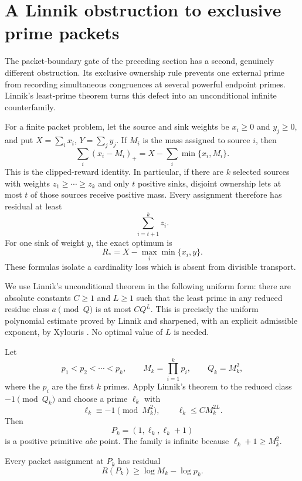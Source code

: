 \section{A Linnik obstruction to exclusive prime packets}
\label{sec:prime-packet-linnik-obstruction}

The packet-boundary gate of the preceding section has a second, genuinely
different obstruction.  Its exclusive ownership rule prevents one external
prime from recording simultaneous congruences at several powerful endpoint
primes.  Linnik's least-prime theorem turns this defect into an unconditional
infinite counterfamily.

For a finite packet problem, let the source and sink weights be $x_i\ge0$ and
$y_j\ge0$, and put $X=\sum_i x_i$, $Y=\sum_jy_j$.  If $M_i$ is the mass
assigned to source $i$, then
\[
 \sum_i(x_i-M_i)_+
   =X-\sum_i\min\{x_i,M_i\}.
 \tag{LPO-1}
\]
This is the clipped-reward identity.  In particular, if there are $k$
selected sources with weights $z_1\ge\cdots\ge z_k$ and only $t$ positive
sinks, disjoint ownership lets at most $t$ of those sources receive positive
mass.  Every assignment therefore has residual at least
\[
                         \sum_{i=t+1}^{k}z_i.
 \tag{LPO-2}
\]
For one sink of weight $y$, the exact optimum is
\[
 R_*=X-\max_i\min\{x_i,y\}.
 \tag{LPO-3}
\]
These formulas isolate a cardinality loss which is absent from divisible
transport.

We use Linnik's unconditional theorem in the following uniform form: there
are absolute constants $C\ge1$ and $L\ge1$ such that the least prime in any
reduced residue class $a\pmod Q$ is at most $CQ^L$.  This is precisely the
uniform polynomial estimate proved by Linnik and sharpened, with an explicit
admissible exponent, by Xylouris
\cite[Theorem~1.1]{XylourisLinnik2009}.  No optimal value of $L$ is needed.

Let
\[
 p_1<p_2<\cdots<p_k,\qquad M_k=\prod_{i=1}^{k}p_i,
 \qquad Q_k=M_k^2,
\]
where the $p_i$ are the first $k$ primes.  Apply Linnik's theorem to the
reduced class $-1\pmod{Q_k}$ and choose a prime $\ell_k$ with
\[
 \ell_k\equiv-1\pmod{M_k^2},\qquad
 \ell_k\le C M_k^{2L}.
 \tag{LPO-4}
\]
Then
\[
                         P_k=(1,\ell_k,\ell_k+1)
 \tag{LPO-5}
\]
is a positive primitive $abc$ point.  The family is infinite because
$\ell_k+1\ge M_k^2$.

\begin{lemma}
\label{lem:linnik-packet-residual}
Every packet assignment at $P_k$ has residual
\[
                         R(P_k)\ge\log M_k-\log p_k.
 \tag{LPO-6}
\]
\end{lemma}

